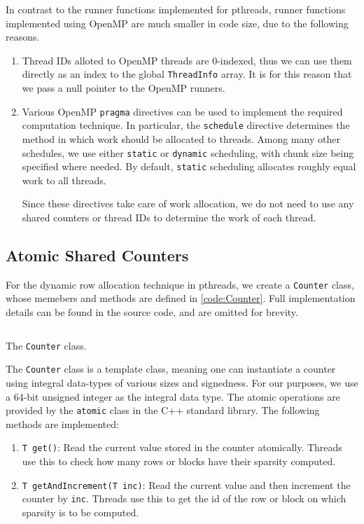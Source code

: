\documentclass[conference,compsoc]{IEEEtran}
\begin{document}
In contrast to the runner functions implemented for pthreads, runner functions
implemented using OpenMP are much smaller in code size, due to the following
reasons.

\begin{enumerate}
    \item Thread IDs alloted to OpenMP threads are 0-indexed, thus we can use
    them directly as an index to the global \texttt{ThreadInfo} array. It is for
    this reason that we pass a null pointer to the OpenMP runners. 
    \item Various OpenMP \texttt{pragma} directives can be used to implement the
    required computation technique. In particular, the \texttt{schedule}
    directive determines the method in which work should be allocated to
    threads. Among many other schedules, we use either \texttt{static} or
    \texttt{dynamic} scheduling, with chunk size being specified where needed.
    By default, \texttt{static} scheduling allocates roughly equal work to all
    threads.
    
    Since these directives take care of work allocation, we do not need to use
    any shared counters or thread IDs to determine the work of each thread. 
\end{enumerate}

\subsection{Atomic Shared Counters}
\label{subsec:counter}

For the dynamic row allocation technique in pthreads, we create a
\texttt{Counter} class, whose memebers and methods are defined in
\autoref{code:Counter}. Full implementation details can be found in the source
code, and are omitted for brevity.

\begin{listing}[!ht]
\inputminted{cpp}{codes/Counter.cpp}
\caption{The \texttt{Counter} class.}
\label{code:Counter}
\end{listing}

The \texttt{Counter} class is a template class, meaning one can instantiate a
counter using integral data-types of various sizes and signedness. For our
purposes, we use a 64-bit unsigned integer as the integral data type. The atomic
operations are provided by the \texttt{atomic} class in the C++ standard
library. The following methods are implemented:

\begin{enumerate}
    \item \texttt{T get()}: Read the current value stored in the counter
    atomically. Threads use this to check how many rows or blocks have their
    sparsity computed.
    \item \texttt{T getAndIncrement(T inc)}: Read the current value and then
    increment the counter by \texttt{inc}. Threads use this to get the id of the
    row or block on which sparsity is to be computed. 
\end{enumerate}
\end{document}
